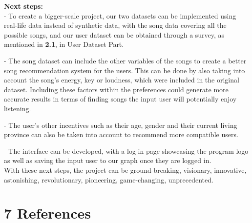 \documentclass[fontsize=11pt]{article}
\numberwithin{equation}{section}
\theoremstyle{plain} %
\theoremstyle{definition}
\theoremstyle{remark}
\begin{document}
\bigskip

\textbf{Next steps:}
\\

- To create a bigger-scale project, our two datasets can be implemented using real-life data instead of synthetic data, with the song data covering all the possible songs, and our user dataset can be obtained through a survey, as mentioned in \textbf{2.1}, in User Dataset Part.

- The song dataset can include the other variables of the songs to create a better song recommendation system for the users. This can be done by also taking into account the song's energy, key or loudness, which were included in the original dataset. Including these factors within the preferences could generate more accurate results in terms of finding songs the input user will potentially enjoy listening.

- The user's other incentives such as their age, gender and their current living province can also be taken into account to recommend more compatible users. 

- The interface can be developed, with a log-in page showcasing the program logo as well as saving the input user to our graph once they are logged in.
\\


With these next steps, the project can be ground-breaking, visionary, innovative, astonishing, revolutionary, pioneering, game-changing, unprecedented.
\clearpage


\section*{7 References}
\end{document}
